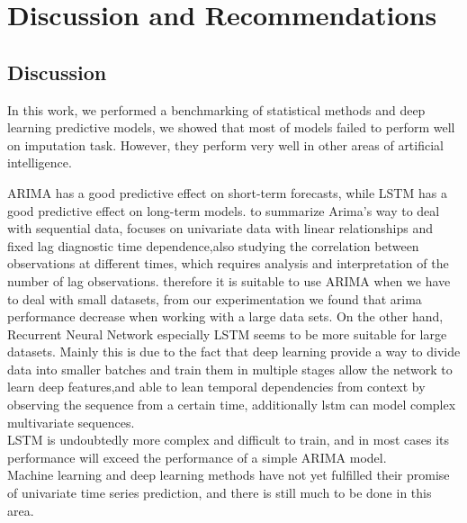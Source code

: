 
\chapter{Discussion and Recommendations} \label{hgr}

\section{Discussion }

In this work, we performed a benchmarking of statistical methods and deep learning predictive  models, we showed that most of models failed to perform well on imputation task. However, they perform very well in other areas of artificial intelligence.

ARIMA has a good predictive effect on short-term forecasts, while LSTM has a good predictive effect on long-term models. to summarize Arima's way to deal with sequential data, focuses on univariate data with linear relationships and fixed lag  diagnostic time dependence,also studying the correlation between observations at different times, which requires analysis and interpretation of the number of lag observations. therefore it is suitable to use ARIMA  when we have to deal with small datasets, from our experimentation we found that arima performance decrease when working with a large data sets. On the other hand, Recurrent Neural Network especially LSTM seems to be more suitable for large datasets. Mainly this is due to  the fact that deep learning  provide a way to divide data  into smaller batches and train them in multiple stages allow the network to learn deep features,and able to lean temporal dependencies from context by observing the sequence from a certain time, additionally lstm  can model complex multivariate sequences.\\LSTM is undoubtedly more complex and difficult to train, and in most cases its performance will  exceed the performance of a simple ARIMA model.\\Machine learning and deep learning methods have not yet fulfilled their promise of univariate time series prediction, and there is still much to be done in this area.


